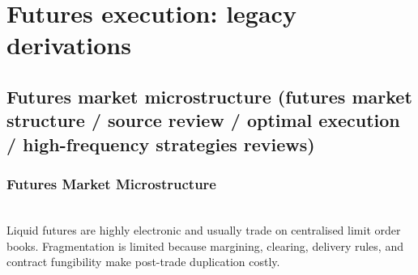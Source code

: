 \documentclass[a4paper,oneside,openany]{book}
\begin{document}
\chapter*{Futures execution: legacy derivations}

\section*{Futures market microstructure (futures market structure / source review / optimal execution / high-frequency strategies reviews)}

\subsection*{Futures Market Microstructure}

\begin{principle} \\
Liquid futures are highly electronic and usually trade on centralised limit order books. Fragmentation is limited because margining, clearing, delivery rules, and contract fungibility make post-trade duplication costly.
\end{principle}
\end{document}
